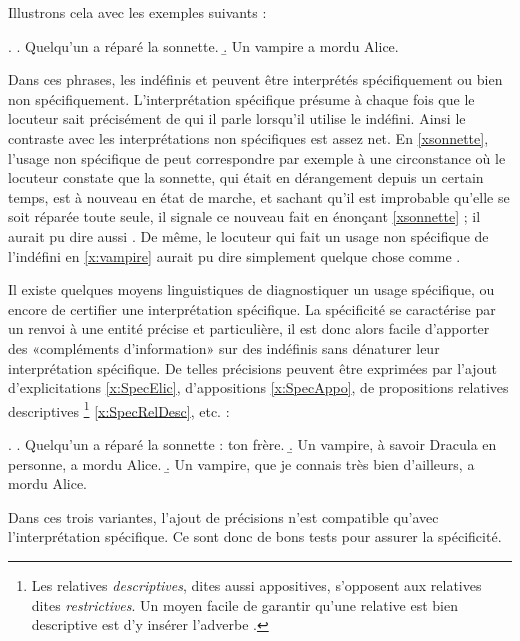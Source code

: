 Illustrons cela avec les exemples suivants :

\ex.\label{x:sonnvamp} 
\a. Quelqu'un a réparé la sonnette.
\label{xsonnette}
\b.  
Un vampire a mordu Alice.
\label{x:vampire}

Dans ces phrases, les indéfinis  et  peuvent être interprétés spécifiquement ou bien non
spécifiquement.  L'interprétation spécifique présume à chaque fois que
le locuteur sait précisément de qui il parle lorsqu'il utilise le
{\GN} indéfini.   Ainsi le contraste avec les interprétations non
spécifiques est assez net.  En \ref{xsonnette}, l'usage non spécifique
de  peut correspondre par exemple à une circonstance
où le locuteur constate que la sonnette, qui était en dérangement
depuis un certain temps, est à nouveau en état de marche, et sachant
qu'il est improbable qu'elle se soit réparée toute seule, il signale
ce nouveau fait en énonçant \ref{xsonnette} ; il aurait pu dire aussi
.  De même, le locuteur qui
fait un usage non spécifique de l'indéfini en \ref{x:vampire} aurait
pu dire simplement quelque chose comme .

\newpage

Il existe quelques moyens linguistiques de diagnostiquer un usage
spécifique, ou encore de certifier une interprétation spécifique. 
La spécificité se caractérise par un renvoi à une entité
précise et particulière, il est donc alors facile d'apporter des
«compléments d'information» sur des {\GN} indéfinis sans dénaturer
leur interprétation spécifique.  De telles précisions peuvent être
exprimées par l'ajout 
d'explicitations \ref{x:SpecElic}, d'appositions \ref{x:SpecAppo}, 
de propositions relatives descriptives%
\footnote{Les relatives \emph{descriptives}, dites aussi
  appositives, s'opposent aux relatives dites \emph{restrictives}.  
Un moyen facile de garantir qu'une relative est bien descriptive est d'y
insérer l'adverbe .}
\ref{x:SpecRelDesc}, etc. :

\ex. 
\a. Quelqu'un a réparé la sonnette : ton frère.\label{x:SpecElic}
\b. Un vampire, à savoir Dracula en personne, a mordu Alice.\label{x:SpecAppo}
\b. Un vampire, que je connais très bien d'ailleurs, a mordu Alice.
\label{x:SpecRelDesc}


Dans ces trois variantes, l'ajout de précisions n'est compatible
qu'avec l'interprétation spécifique.  Ce sont donc de bons tests pour
assurer la spécificité.  

